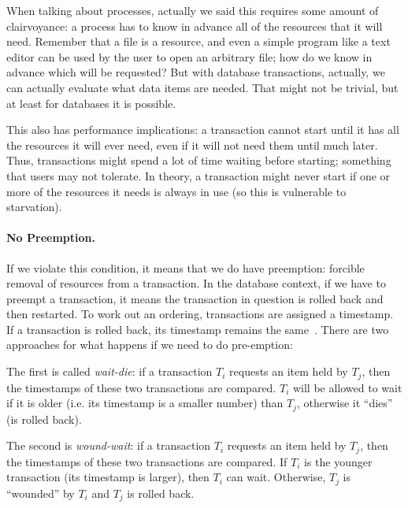 When talking about processes, actually we said this requires some amount of clairvoyance: a process has to know in advance all of the resources that it will need. Remember that a file is a resource, and even a simple program like a text editor can be used by the user to open an arbitrary file; how do we know in advance which will be requested? But with database transactions, actually, we can actually evaluate what data items are needed. That might not be trivial, but at least for databases it is possible.

This also has performance implications: a transaction cannot start until it has all the resources it will ever need, even if it will not need them until much later. Thus, transactions might spend a lot of time waiting before starting; something that users may not tolerate. In theory, a transaction might never start if one or more of the resources it needs is always in use (so this is vulnerable to starvation).
 


\paragraph{No Preemption.} If we violate this condition, it means that we do have preemption: forcible removal of resources from a transaction. In the database context, if we have to preempt a transaction, it means the transaction in question is rolled back and then restarted. To work out an ordering, transactions are assigned a timestamp. If a transaction is rolled back, its timestamp remains the same~\cite{dsc}. There are two approaches for what happens if we need to do pre-emption:

The first is called \textit{wait-die}: if a transaction $T_{i}$ requests an item held by $T_{j}$, then the timestamps of these two transactions are compared. $T_{i}$ will be allowed to wait if it is older (i.e. its timestamp is a smaller number) than $T_{j}$, otherwise it ``dies'' (is rolled back). 

The second is \textit{wound-wait}: if a transaction $T_{i}$ requests an item held by $T_{j}$, then the timestamps of these two transactions are compared. If $T_{i}$ is the younger transaction (its timestamp is larger), then $T_{i}$ can wait. Otherwise, $T_{j}$ is ``wounded'' by $T_{i}$ and $T_{j}$ is rolled back.

